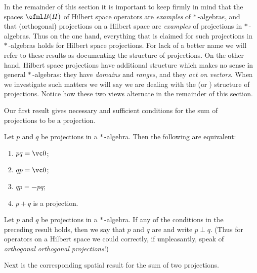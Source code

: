 In the remainder of this section it is important to keep firmly in mind that the spaces $\ofml B(H)$ of Hilbert
space operators are \emph{examples} of $*\,$-algebras, and that (orthogonal) projections on a Hilbert space are
\emph{examples} of projections in $*\,$-algebras.  Thus on  the one hand, everything that is claimed for
such projections in $*\,$-algebras holds for Hilbert space projections.  For lack of a better name we will refer to
these results as documenting the
 structure of projections.  On the other hand, Hilbert space projections have additional structure which
makes no sense in general $*\,$-algebras: they have \emph{domains} and \emph{ranges}, and they \emph{act on vectors}.
When we investigate such matters we will say we are dealing with the
 (or ) structure of projections.  Notice how these two views alternate in the remainder of this section.

Our first result gives necessary and sufficient conditions for the sum of projections to be a projection.

\begin{prop}\label{prop_sum_projs} Let $p$ and $q$ be projections in a $*\,$-algebra. Then the following are equivalent:
 \begin{enumerate}[label=\rm{(\alph*)}]
  \item $pq = \vc 0$;
  \item $qp = \vc 0$;
  \item $qp = -pq$;
  \item $p + q$ is a projection.
 \end{enumerate}
\end{prop}

\begin{defn}\label{def_perp_projs} Let $p$ and $q$ be projections in a $*\,$-algebra.  If any of the conditions
in the preceding result holds, then we say that $p$ and $q$ are
 and write
$p \perp q$.  (Thus for operators on a Hilbert space we could correctly, if unpleasantly, speak of
\emph{orthogonal orthogonal projections}!)
\end{defn}

Next is the corresponding spatial result for the sum of two projections.

